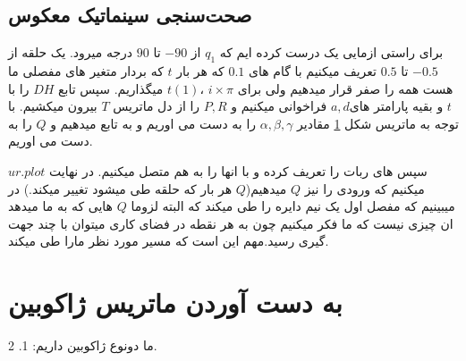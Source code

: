 \documentclass{article}
\begin{document}
\subsection{صحت‌سنجی سینماتیک معکوس}
برای راستی ازمایی یک  درست کرده ایم که $q_1$ از $-90$ تا $90$  درجه میرود.
یک حلقه از  $-0.5$ تا $0.5$ تعریف میکنیم با گام های $0.1$ که هر بار $t$ که بردار متغیر های مفصلی ما هست همه را صفر قرار میدهیم ولی برای $i \times \pi$ ،$t(1)$ میگذاریم. سپس تابع $DH$ را با $t$ و بقیه پارامتر های$a, d$ فراخوانی میکنیم و $P, R$ را از دل ماتریس $T$ بیرون میکشیم.
با توجه به ماتریس شکل \ref{fig:formula223} مقادیر $\alpha, \beta, \gamma$ را به دست می اوریم و به تابع   میدهیم و $Q$ را به دست می اوریم.
\\
\begin{figure}[H]%
	\centering
    \caption{\label{fig:formula223}}
\end{figure}
\noindent
سپس  های ربات را تعریف کرده و با  انها را به هم متصل میکنیم. در نهایت $ur.plot$  میکنیم که ورودی را نیز $Q$ میدهیم($Q$ هر بار که حلقه طی میشود تغییر میکند.)
در میبینیم که مفصل اول یک نیم دایره را طی میکند که البته لزوما $Q$ هایی که به ما میدهد ان چیزی نیست که ما فکر میکنیم چون به هر نقطه در فضای کاری میتوان با چند جهت گیری رسید.مهم این است که مسیر مورد نظر مارا طی میکند.



\section{به دست آوردن ماتریس ژاکوبین}
ما دونوع ژاکوبین داریم: 1.  2. 
\end{document}
